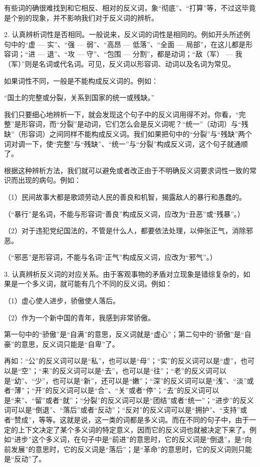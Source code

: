 有些词的确很难找到和它相反、相对的反义词，象“彻底”、“打算”等，不过这毕竟是个别的现象，并不影响我们对于反义词的辨析。

2. 认真辨析词性是否相同。一般说来，反义词的词性是相同的。例如开头所述例句中的“虚 --- 实”、“强 --- 弱”、“高昂 --- 低落”、“全面 --- 局部”，在这儿都是形容词；“进 --- 退”、“攻 --- 守”、“包围 --- 分割”，都是动词；“敌（军） --- 我（军）”则是名词或代名词。可见，反义词以形容词、动词以及名词为常见。

如果词性不同，一般是不能构成反义词的。例如：

“国土的完整或分裂，关系到国家的统一或残缺。”

我们只要细心地辨析一下，就会发现这个句子中的反义词用得不对。你看，“完整”是形容词，而“分裂”是动词，它们怎么会是反义词呢？“统一”（动词）与“残缺”（形容词）之间同样不能构成反义词。我们如果把句中的“分裂”与“残缺”两个词对调一下，使“完整”与“残缺”、“统一”与“分裂”构成反义词，这个句子就通顺了。

根据这种辨析方法，我们就可以避免或者改正由于不明确反义词要求词性一致的常识而出现的病句。例如：

（1）民间故事大都是歌颂劳动人民的善良和机智，揭露敌人的暴行和愚蠢的。

（“暴行”是名词，不能与形容词“善良”构成反义词，应改为“丑恶”或“残暴”。）

（2）对于违犯党纪国法的，不管是什么人，都要依法处理，以伸张正气，消除邪恶。

（“邪恶”是形容词，不能与名词“正气”构成反义词，应改为“邪气”。）

3. 认真辨析反义词的对应关系。由于客观事物的矛盾对立现象是错综复杂的，如果是一个多义词，就可能有几个不同的反义词。例如：

（1）虚心使人进步，骄傲使人落后。

（2）作为一个新中国的青年，我感到非常骄傲。

第一句中的“骄傲”是“自满”的意思，反义词就是“虚心”；第二句中的“骄傲”是“自豪”的意思，反义词只能是“自卑”了。

再如：“公”的反义词可以是“私”，也可以是“母”；“实”的反义词可以是“虚”，也可以是“空”；“来”的反义词可以是“去”，也可以是“往”；“老”的反义词可以是“幼”、“少”，也可以是“新”，还可以是“嫩”；“深”的反义词可以是“浅”、“淡”或者“薄”；“开”的反义词可以是“合”、“关”或者“停”；“去”的反义词可以是“来”、“留”或者“就”；“分裂”的反义词可以是“团结”或者“统一”；“进步”的反义词可以是“倒退”、“落后”或者“反动”；“反对”的反义词可以是“拥护”、“支持”或者“赞成”，等等。这就是说，这一类的词都是多义词。而在不同的句子中，由于一定的上下文决定了某个多义词的特定意义，因而它的反义词也就被决定下来了。例如“进步”这个多义词，在句子中是“前进”的意思时，它的反义词是“倒退”，是“向前发展”的意思时，它的反义词是“落后”；是“革命”的意思时，它的反义词则只能是“反动”了。

